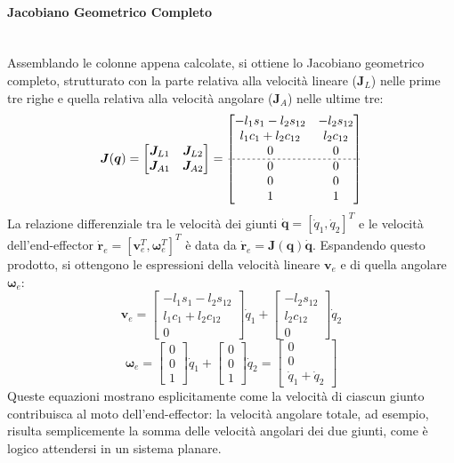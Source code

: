 \documentclass[11pt, a4paper]{report}
\begin{document}
\paragraph{Jacobiano Geometrico Completo}\mbox{}\\
Assemblando le colonne appena calcolate, si ottiene lo Jacobiano geometrico completo, strutturato con la parte relativa alla velocità lineare (\(\bm{J}_L\)) nelle prime tre righe e quella relativa alla velocità angolare (\(\bm{J}_A\)) nelle ultime tre:
\[
    \bm{J}(\bm{q}) =
    \begin{bmatrix}
        \bm{J}_{L1} & \bm{J}_{L2} \\
        \bm{J}_{A1} & \bm{J}_{A2}
    \end{bmatrix}
    =
    \begin{bmatrix}
        -l_1 s_1 - l_2 s_{12} & -l_2 s_{12} \\
        l_1 c_1 + l_2 c_{12} & l_2 c_{12} \\
        0 & 0 \\
        \hdashline[2pt/2pt]
        0 & 0 \\
        0 & 0 \\
        1 & 1
    \end{bmatrix}
\]
La relazione differenziale tra le velocità dei giunti \(\dot{\bm{q}} = [\dot{q}_1, \dot{q}_2]^T\) e le velocità dell'end-effector \(\bm{\dot{r}}_e = [\bm{v}_e^T, \bm{\omega}_e^T]^T\) è data da \(\bm{\dot{r}}_e = \bm{J}(\bm{q})\dot{\bm{q}}\). Espandendo questo prodotto, si ottengono le espressioni della velocità lineare \(\bm{v}_e\) e di quella angolare \(\bm{\omega}_e\):
\[
    \bm{v}_e =
    \begin{bmatrix} -l_1 s_1 - l_2 s_{12} \\ l_1 c_1 + l_2 c_{12} \\ 0 \end{bmatrix} \dot{q}_1
    +
    \begin{bmatrix} -l_2 s_{12} \\ l_2 c_{12} \\ 0 \end{bmatrix} \dot{q}_2
\]
\[
    \bm{\omega}_e =
    \begin{bmatrix} 0 \\ 0 \\ 1 \end{bmatrix} \dot{q}_1
    +
    \begin{bmatrix} 0 \\ 0 \\ 1 \end{bmatrix} \dot{q}_2
    = \begin{bmatrix} 0 \\ 0 \\ \dot{q}_1 + \dot{q}_2 \end{bmatrix}
\]
Queste equazioni mostrano esplicitamente come la velocità di ciascun giunto contribuisca al moto dell'end-effector: la velocità angolare totale, ad esempio, risulta semplicemente la somma delle velocità angolari dei due giunti, come è logico attendersi in un sistema planare.
\end{document}
